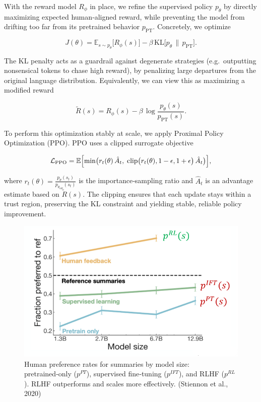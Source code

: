 \documentclass{article}
\begin{document}
With the reward model \(R_\phi\) in place, we refine the supervised policy \(p_\theta\) by directly maximizing expected human‐aligned reward, while preventing the model from drifting too far from its pretrained behavior \(p_{\mathrm{PT}}\).  Concretely, we optimize

\[
  J(\theta)
  = \mathbb{E}_{s\sim p_\theta}\bigl[R_\phi(s)\bigr]
    - \beta\,\mathrm{KL}\bigl[p_\theta \,\|\, p_{\mathrm{PT}}\bigr].
\]

The KL penalty acts as a guardrail against degenerate strategies (e.g.\ outputting nonsensical tokens to chase high reward), by penalizing large departures from the original language distribution.  Equivalently, we can view this as maximizing a modified reward

\[
  \widetilde R(s)
  = R_\phi(s)
    - \beta\,\log\frac{p_\theta(s)}{p_{\mathrm{PT}}(s)}.
\]

To perform this optimization stably at scale, we apply Proximal Policy Optimization (PPO).  PPO uses a clipped surrogate objective

\[
  \mathcal{L}_{\mathrm{PPO}}
  = \mathbb{E}\Bigl[\min\bigl(r_t(\theta)\,\hat A_t,\;
    \mathrm{clip}\bigl(r_t(\theta),1-\epsilon,1+\epsilon\bigr)\,\hat A_t\bigr)\Bigr],
\]

where \(r_t(\theta)=\frac{p_\theta(s_t)}{p_{\theta_{\mathrm{old}}}(s_t)}\) is the importance‐sampling ratio and \(\hat A_t\) is an advantage estimate based on \(\widetilde R(s)\).  The clipping ensures that each update stays within a trust region, preserving the KL constraint and yielding stable, reliable policy improvement.

\begin{figure}[ht]
    \centering
    \includegraphics[width=0.65\linewidth]{graphics/S11RLHF/performance_rlhf.png}
    \caption{Human preference rates for summaries by model size: pretrained‑only (\(p^{PT}\)), supervised fine‑tuning (\(p^{IFT}\)), and RLHF (\(p^{RL}\)). RLHF outperforms and scales more effectively. (Stiennon et al., 2020)}
    \label{fig:performance-rlhf}
\end{figure}
\end{document}
